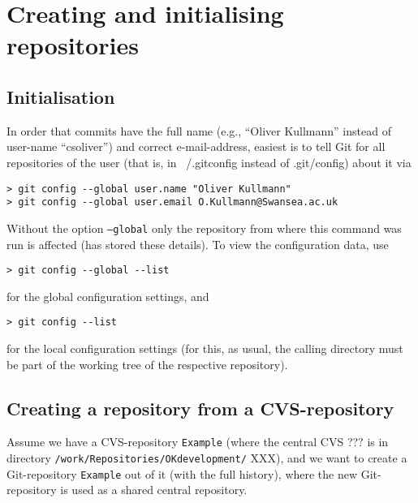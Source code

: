 \documentclass{book}
\newcommand{\filename}[1]{\texttt{#1}}
\begin{document}
\section{Creating and initialising repositories}
\label{sec:GitInit}

\subsection{Initialisation}
\label{sec:GitInitialisation}

In order that commits have the full name (e.g., ``Oliver Kullmann'' instead of user-name ``csoliver'') and correct e-mail-address, easiest is to tell Git for all repositories of the user (that is, in  ~/.gitconfig instead of .git/config) about it via
\begin{verbatim}
> git config --global user.name "Oliver Kullmann"
> git config --global user.email O.Kullmann@Swansea.ac.uk
\end{verbatim}
Without the option \texttt{--global} only the repository from where this command was run is affected (has stored these details). To  view the configuration data, use
\begin{verbatim}
> git config --global --list
\end{verbatim}
for the global configuration settings, and
\begin{verbatim}
> git config --list
\end{verbatim}
for the local configuration settings (for this, as usual, the calling directory must be part of the working tree of the respective repository).





\subsection{Creating a repository from a CVS-repository}
\label{sec:CVStoGit}

Assume we have a CVS-repository \texttt{Example} (where the central CVS ??? is in directory \filename{/work/Repositories/OKdevelopment/} XXX), and we want to create a Git-repository \texttt{Example} out of it (with the full history), where the new Git-repository is used as a shared central repository.
\end{document}

